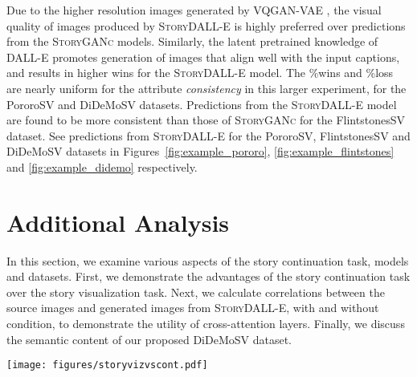 \documentclass[runningheads]{llncs}
\newcommand{\sdalle}[1]{\textsc{StoryDALL-E}}
\newcommand{\sgan}[1]{\textsc{StoryGANc}}
\begin{document}
Due to the higher resolution images generated by VQGAN-VAE \cite{esser2021taming}, the visual quality of images produced by \sdalle{} is highly preferred over predictions from the \sgan{} models. Similarly, the latent pretrained knowledge of DALL-E promotes generation of images that align well with the input captions, and results in higher wins for the \sdalle{} model. The \%wins and \%loss are nearly uniform for the attribute \textit{consistency} in this larger experiment, for the PororoSV and DiDeMoSV datasets. Predictions from the \sdalle{} model are found to be more consistent than those of \sgan{} for the FlintstonesSV dataset. See predictions from \sdalle{} for the PororoSV, FlintstonesSV and DiDeMoSV datasets in Figures~\ref{fig:example_pororo}, \ref{fig:example_flintstones} and \ref{fig:example_didemo} respectively.



\section{Additional Analysis}
In this section, we examine various aspects of the story continuation task, models and datasets. First, we demonstrate the advantages of the story continuation task over the story visualization task. Next, we calculate correlations between the source images and generated images from \sdalle{}, with and without condition, to demonstrate the utility of cross-attention layers. Finally, we discuss the semantic content of our proposed DiDeMoSV dataset.

\begin{figure*}
    \centering
    \texttt{[image: figures/storyvizvscont.pdf]}
    \caption{Comparison of predictions from state-of-the-art story visualization model VLCStoryGAN (middle) and our story continuation model \sgan{} (bottom) for a sample from the PororoSV dataset (top).}
    \label{fig:vizvcont}
\end{figure*}
\end{document}
